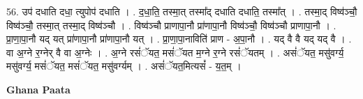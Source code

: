 \documentclass[17pt]{extarticle}
\begin{document}
56. उप॑ दधाति दधा॒ त्युपोप॑ दधाति । . द॒धा॒ति॒ तस्मा॒त् तस्मा᳚द् दधाति दधाति॒ तस्मा᳚त् । . तस्मा॒द् विष्व॑ञ्चौ॒ विष्व॑ञ्चौ॒ तस्मा॒त् तस्मा॒द् विष्व॑ञ्चौ । . विष्व॑ञ्चौ प्राणापा॒नौ प्रा॑णापा॒नौ विष्व॑ञ्चौ॒ विष्व॑ञ्चौ प्राणापा॒नौ । . प्रा॒णा॒पा॒नौ यद् यत् प्रा॑णापा॒नौ प्रा॑णापा॒नौ यत् । . प्रा॒णा॒पा॒नाविति॑ प्राण - अ॒पा॒नौ । . यद् वै वै यद् यद् वै । . वा अ॒ग्ने र॒ग्नेर् वै वा अ॒ग्नेः । . अ॒ग्ने रसं॑ॅयत॒ मसं॑ॅयत म॒ग्ने र॒ग्ने रसं॑ॅयतम् । . असं॑ॅयत॒ मसु॑वर्ग्य॒ मसु॑वर्ग्य॒ मसं॑ॅयत॒ मसं॑ॅयत॒ मसु॑वर्ग्यम् । . असं॑ॅयत॒मित्यसं᳚ - य॒त॒म् । \newline

\textbf{Ghana Paata } \newline
\end{document}
